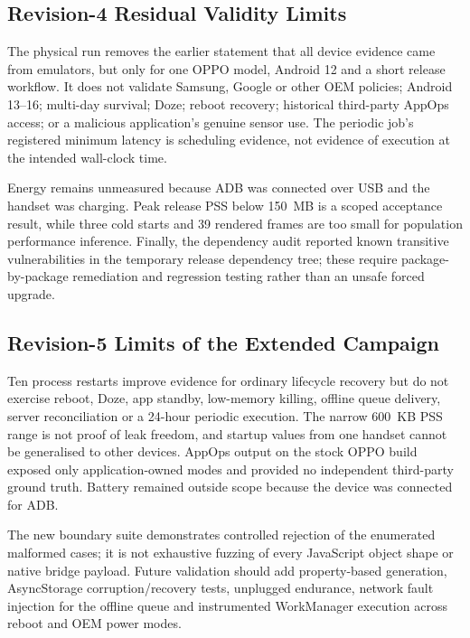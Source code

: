 \subsection{Revision-4 Residual Validity Limits}

The physical run removes the earlier statement that all device evidence came from emulators, but only for one OPPO model, Android 12 and a short release workflow. It does not validate Samsung, Google or other OEM policies; Android 13--16; multi-day survival; Doze; reboot recovery; historical third-party AppOps access; or a malicious application's genuine sensor use. The periodic job's registered minimum latency is scheduling evidence, not evidence of execution at the intended wall-clock time.

Energy remains unmeasured because ADB was connected over USB and the handset was charging. Peak release PSS below 150~MB is a scoped acceptance result, while three cold starts and 39 rendered frames are too small for population performance inference. Finally, the dependency audit reported known transitive vulnerabilities in the temporary release dependency tree; these require package-by-package remediation and regression testing rather than an unsafe forced upgrade.
\subsection{Revision-5 Limits of the Extended Campaign}

Ten process restarts improve evidence for ordinary lifecycle recovery but do not exercise reboot, Doze, app standby, low-memory killing, offline queue delivery, server reconciliation or a 24-hour periodic execution. The narrow 600~KB PSS range is not proof of leak freedom, and startup values from one handset cannot be generalised to other devices. AppOps output on the stock OPPO build exposed only application-owned modes and provided no independent third-party ground truth. Battery remained outside scope because the device was connected for ADB.

The new boundary suite demonstrates controlled rejection of the enumerated malformed cases; it is not exhaustive fuzzing of every JavaScript object shape or native bridge payload. Future validation should add property-based generation, AsyncStorage corruption/recovery tests, unplugged endurance, network fault injection for the offline queue and instrumented WorkManager execution across reboot and OEM power modes.
